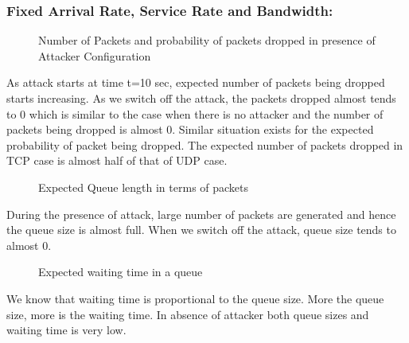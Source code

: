 \subsubsection*{Fixed Arrival Rate, Service Rate and Bandwidth:}

\begin{figure}[!htb]
	\centering
	\qquad
	\caption{{Number of Packets and probability of packets dropped in presence of Attacker Configuration}}
	\label{fig:figac1}
\end{figure}

As attack starts at time t=10 sec, expected number of packets being dropped starts increasing. As we switch off the attack, the packets dropped almost tends to 0 which is similar to the case when there is no attacker and the number of packets being dropped is almost 0. Similar situation exists for the expected probability of packet being dropped. The expected number of packets dropped in TCP case is almost half of that of UDP case.  

\begin{figure}[!htb]
	\centering
	\qquad
	\caption{{Expected Queue length in terms of packets}}
	\label{fig:figad1}
\end{figure}

During the presence of attack, large number of packets are generated and hence the queue size is almost full. When we switch off the attack, queue size tends to almost 0.

\begin{figure}[!htb]
	\centering
	\qquad
	\caption{{Expected waiting time in a queue}}
	\label{fig:figae1}
\end{figure}

We know that waiting time is proportional to the queue size. More the queue size, more is the waiting time. In absence of attacker both queue sizes and waiting time is very low. 

